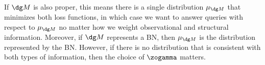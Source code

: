 %
%
%
\def\PrM{\mu_{\dg M}}%
If $\dg M$ is also proper,
    this means there is
    a single distribution $\PrM$
    that minimizes both loss functions, 
    in which case we want to answer queries with respect to $\PrM$
    no matter how we weight observational and structural information. 
Moreover, if $\dg M$ represents a BN,
then $\PrM$ is the distribution represented by the BN.  
However, if there is no distribution that is consistent with both types of information, then the choice of $\zogamma$ matters.  

